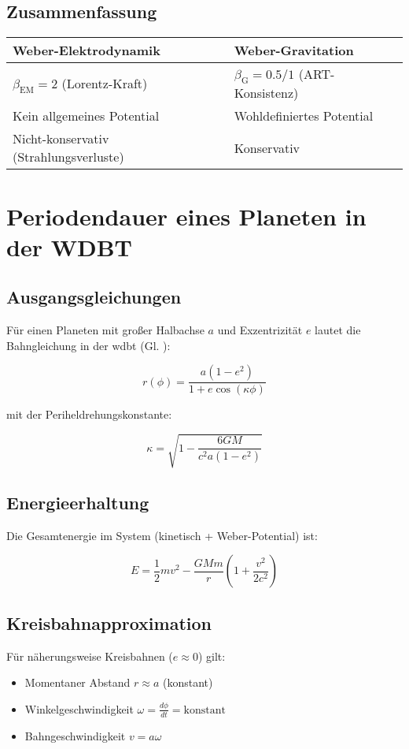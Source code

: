 \subsection*{Zusammenfassung}
\begin{tabular}{ll}
\textbf{Weber-Elektrodynamik} & \textbf{Weber-Gravitation} \\ \hline
$\beta_{\text{EM}} = 2$ (Lorentz-Kraft) & $\beta_{\text{G}} = 0.5/1$ (ART-Konsistenz) \\
Kein allgemeines Potential & Wohldefiniertes Potential \\
Nicht-konservativ (Strahlungsverluste) & Konservativ \\
\end{tabular}

\section{Periodendauer eines Planeten in der WDBT}
\label{sec:periodendauer}

\subsection*{Ausgangsgleichungen}
Für einen Planeten mit großer Halbachse \( a \) und Exzentrizität \( e \) lautet die Bahngleichung in der \gls{wdbt} (Gl. ):

\begin{equation}
r(\phi) = \frac{a(1-e^2)}{1 + e \cos(\kappa \phi)}
\end{equation}

mit der Periheldrehungskonstante:

\begin{equation}
\kappa = \sqrt{1 - \frac{6GM}{c^2 a(1-e^2)}}
\end{equation}

\subsection*{Energieerhaltung}
Die Gesamtenergie im System (kinetisch + Weber-Potential) ist:

\begin{equation}
E = \frac{1}{2}mv^2 - \frac{GMm}{r}\left(1 + \frac{v^2}{2c^2}\right)
\end{equation}

\subsection*{Kreisbahnapproximation}
Für näherungsweise Kreisbahnen (\( e \approx 0 \)) gilt:
\begin{itemize}
\item Momentaner Abstand \( r \approx a \) (konstant)
\item Winkelgeschwindigkeit \( \omega = \frac{d\phi}{dt} = \text{konstant} \)
\item Bahngeschwindigkeit \( v = a\omega \)
\end{itemize}


